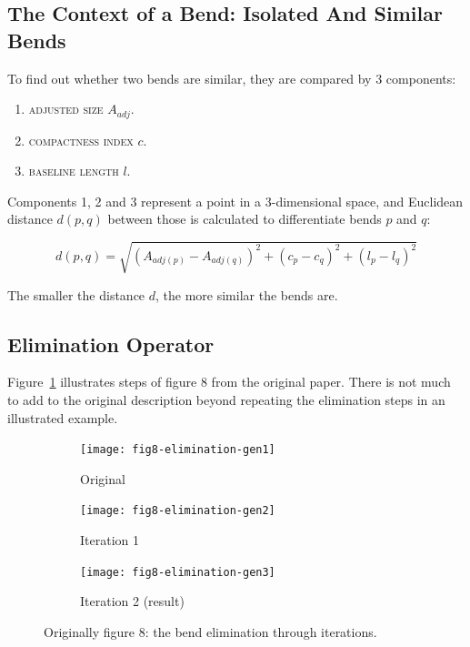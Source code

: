 \documentclass[a4paper]{article}
\begin{document}
\subsection{The Context of a Bend: Isolated And Similar Bends}

To find out whether two bends are similar, they are compared by 3 components:

\begin{enumerate}
  \item \textsc{adjusted size} $A_{adj}$.
  \item \textsc{compactness index} $c$.
  \item \textsc{baseline length} $l$.
\end{enumerate}

Components 1, 2 and 3 represent a point in a 3-dimensional space, and Euclidean
distance $d(p,q)$ between those is calculated to differentiate bends $p$ and
$q$:

\[
  d(p,q) = \sqrt{(A_{adj(p)}-A_{adj(q)})^2 +
                   (c_p-c_q)^2 +
                   (l_p-l_q)^2}
\]

The smaller the distance $d$, the more similar the bends are.

\subsection{Elimination Operator}

Figure~\ref{fig:elimination-through-iterations} illustrates steps of figure 8
from the original paper. There is not much to add to the original description
beyond repeating the elimination steps in an illustrated example.

\begin{figure}[ht]
    \centering
    \begin{subfigure}[b]{.7\textwidth}
        \texttt{[image: fig8-elimination-gen1]}
        \caption{Original}
    \end{subfigure}
    \begin{subfigure}[b]{.7\textwidth}
        \texttt{[image: fig8-elimination-gen2]}
        \caption{Iteration 1}
    \end{subfigure}
    \begin{subfigure}[b]{.7\textwidth}
        \texttt{[image: fig8-elimination-gen3]}
        \caption{Iteration 2 (result)}
    \end{subfigure}
    \caption{Originally figure 8: the bend elimination through iterations.}
    \label{fig:elimination-through-iterations}
\end{figure}
\end{document}
